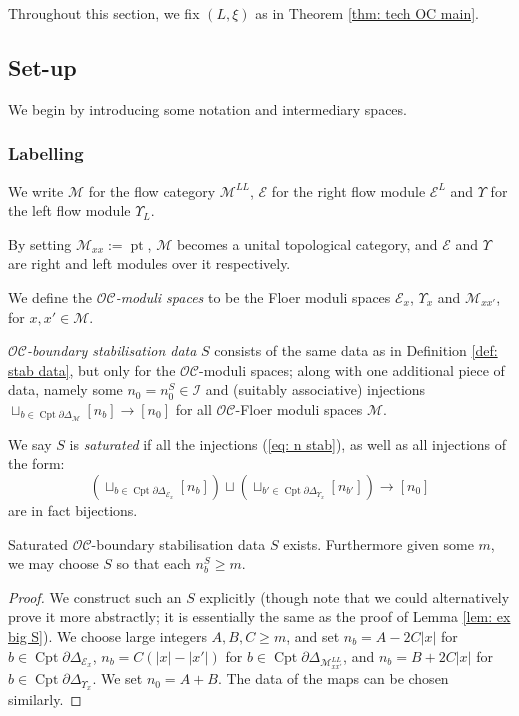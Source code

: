 \documentclass{TPmod}
\newcommand{\Cptd}{\operatorname{Cpt}\partial}
\newcommand{\cC}{\mathcal{C}}
\newcommand{\cE}{\mathcal{E}}
\newcommand{\cI}{\mathcal{I}}
\newcommand{\cM}{\mathcal{M}}
\newcommand{\cO}{\mathcal{O}}
\numberwithin{equation}{section}
\begin{document}
    Throughout this section, we fix $(L, \xi)$ as in Theorem \ref{thm: tech OC main}.
\subsection{Set-up}
    We begin by introducing some notation and intermediary spaces. 
\subsubsection{Labelling}\label{sec: OC lab}
    We write $\cM$ for the flow category $\cM^{LL}$, $\cE$ for the right flow module $\cE^L$ and $\Upsilon$ for the left flow module $\Upsilon_L$.

    By setting $\cM_{xx} := \operatorname{pt}$, $\cM$ becomes a unital topological category, and $\cE$ and $\Upsilon$ are right and left modules over it respectively. 
    \begin{defn}
        We define the \emph{$\cO\cC$-moduli spaces} to be the Floer moduli spaces $\cE_x$, $\Upsilon_x$ and $\cM_{xx'}$, for $x, x' \in \cM$.

        \emph{$\cO\cC$-boundary stabilisation data} $S$ consists of the same data as in Definition \ref{def: stab data}, but only for the $\cO\cC$-moduli spaces; along with one additional piece of data, namely some $n_0=n^S_0 \in \cI$ and (suitably associative) injections $\sqcup_{b \in \Cptd\Delta_\cM}[n_b] \to [n_0]$ for all $\cO\cC$-Floer moduli spaces $\cM$.

        We say $S$ is \emph{saturated} if all the injections (\ref{eq: n stab}), as well as all injections of the form:
        \begin{equation}
            \left(\sqcup_{b \in \Cptd\Delta_{\cE_x}} [n_b]\right) \sqcup \left(\sqcup_{b' \in \Cptd\Delta_{\Upsilon_x}} [n_{b'}]\right) \to [n_0]
        \end{equation}
        are in fact bijections.
    \end{defn}
    \begin{lem}
        Saturated $\cO\cC$-boundary stabilisation data $S$ exists. Furthermore given some $m$, we may choose $S$ so that each $n^S_b \geq m$.
    \end{lem}
    \begin{proof}
        We construct such an $S$ explicitly (though note that we could alternatively prove it more abstractly; it is essentially the same as the proof of Lemma \ref{lem: ex big S}). We choose large integers $A,B,C \geq m$, and set $n_b = A-2C|x|$ for $b \in \Cptd\Delta_{\cE_x}$, $n_b = C(|x|-|x'|)$ for $b \in \Cptd\Delta_{\cM^{LL}_{xx'}}$, and $n_b = B+2C|x|$ for $b \in \Cptd\Delta_{\Upsilon_x}$. We set $n_0 = A+B$. The data of the maps can be chosen similarly. 
    \end{proof}
\end{document}
